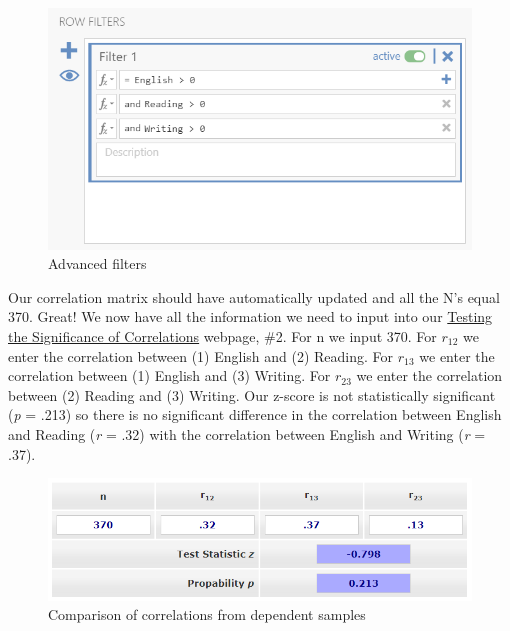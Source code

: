 \documentclass[
]{book}
\begin{document}
\begin{figure}

{\centering \includegraphics[width=1\linewidth]{images/08-correlation/correlation-filters} 

}

\caption{Advanced filters}\label{fig:unnamed-chunk-11}
\end{figure}

Our correlation matrix should have automatically updated and all the N's equal 370. Great! We now have all the information we need to input into our \href{https://www.psychometrica.de/correlation.html}{Testing the Significance of Correlations} webpage, \#2. For n we input 370. For \(r_{12}\) we enter the correlation between (1) English and (2) Reading. For \(r_{13}\) we enter the correlation between (1) English and (3) Writing. For \(r_{23}\) we enter the correlation between (2) Reading and (3) Writing. Our z-score is not statistically significant (\emph{p} = .213) so there is no significant difference in the correlation between English and Reading (\emph{r} = .32) with the correlation between English and Writing (\emph{r} = .37).

\begin{figure}

{\centering \includegraphics[width=1\linewidth]{images/08-correlation/compare-correlations-dependent} 

}

\caption{Comparison of correlations from dependent samples}\label{fig:unnamed-chunk-12}
\end{figure}
\end{document}
